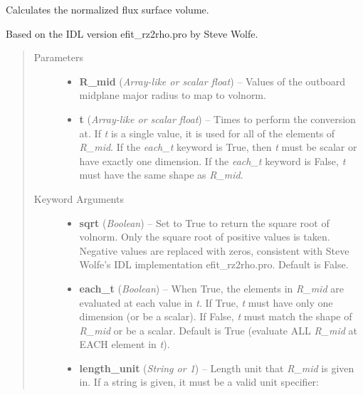 \documentclass[letterpaper,10pt,english]{sphinxmanual}
\begin{document}
\begin{fulllineitems}
\begin{fulllineitems}
\end{fulllineitems}


\begin{fulllineitems}
\label{eqtools:eqtools.core.Equilibrium.rmid2volnorm}
Calculates the normalized flux surface volume.

Based on the IDL version efit\_rz2rho.pro by Steve Wolfe.
\begin{quote}\begin{description}
\item[{Parameters}] \leavevmode\begin{itemize}
\item {} 
\textbf{R\_mid} (\emph{Array-like or scalar float}) --
Values of the outboard midplane
major radius to map to volnorm.

\item {} 
\textbf{t} (\emph{Array-like or scalar float}) --
Times to perform the conversion at.
If \emph{t} is a single value, it is used for all of the elements of
\emph{R\_mid}. If the \emph{each\_t} keyword is True, then \emph{t} must be scalar
or have exactly one dimension. If the \emph{each\_t} keyword is False,
\emph{t} must have the same shape as \emph{R\_mid}.

\end{itemize}

\item[{Keyword Arguments}] \leavevmode\begin{itemize}
\item {} 
\textbf{sqrt} (\emph{Boolean}) --
Set to True to return the square root of volnorm.
Only the square root of positive values is taken. Negative
values are replaced with zeros, consistent with Steve Wolfe's
IDL implementation efit\_rz2rho.pro. Default is False.

\item {} 
\textbf{each\_t} (\emph{Boolean}) --
When True, the elements in \emph{R\_mid} are evaluated
at each value in \emph{t}. If True, \emph{t} must have only one dimension
(or be a scalar). If False, \emph{t} must match the shape of \emph{R\_mid}
or be a scalar. Default is True (evaluate ALL \emph{R\_mid} at EACH
element in \emph{t}).

\item {} 
\textbf{length\_unit} (\emph{String or 1}) --
Length unit that \emph{R\_mid} is given in.
If a string is given, it must be a valid unit specifier:
\begin{quote}


\end{quote}
\end{itemize}
\end{description}
\end{quote}
\end{fulllineitems}
\end{fulllineitems}
\end{document}
